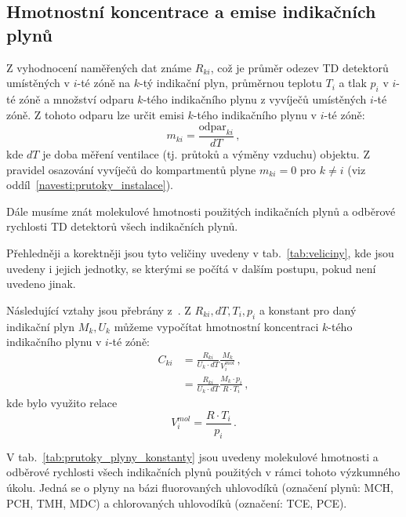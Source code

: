 \subsection{Hmotnostní koncentrace a emise indikačních plynů}
Z vyhodnocení naměřených dat známe $R_{ki}$, což je průměr odezev TD detektorů umístěných v $i$-té zóně na $k$-tý indikační plyn, průměrnou teplotu $T_i$ a tlak $p_i$ v $i$-té zóně a množství odparu $k$-tého indikačního plynu z vyvíječů umístěných $i$-té zóně. Z tohoto odparu lze určit emisi $k$-tého indikačního plynu v $i$-té zóně:
\begin{equation}
    m_{ki}=\frac{\text{odpar}_{ki}}{dT}\,,
    \label{eq:prutoky_emise}
\end{equation}
kde $dT$ je doba měření ventilace (tj. průtoků a výměny vzduchu) objektu. Z pravidel osazování vyvíječů do kompartmentů plyne $m_{ki}=0$ pro $k\neq i$ (viz oddíl~\ref{navesti:prutoky_instalace}). 

Dále musíme znát molekulové hmotnosti použitých indikačních plynů a odběrové rychlosti TD detektorů všech indikačních plynů.

Přehledněji a korektněji jsou tyto veličiny uvedeny v tab.~\ref{tab:veliciny}, kde jsou uvedeny i jejich jednotky, se kterými se počítá v dalším postupu, pokud není uvedeno jinak.

Následující vztahy jsou přebrány z~\cite{metodika}. Z $R_{ki}, dT, T_i, p_i$ a konstant pro daný indikační plyn $M_k, U_k$ můžeme vypočítat hmotnostní koncentraci $k$-tého indikačního plynu v $i$-té zóně:
\begin{align}
    C_{ki}&=\frac{R_{ki}}{U_k\cdot dT}\frac{M_k}{V_{i}^{mol}}\,,\\
    &=\frac{R_{ki}}{U_k\cdot dT}\frac{M_k\cdot p_i}{R\cdot T_i}\,,
\end{align}
kde bylo využito relace
\begin{equation}
    V^{mol}_{i}=\frac{R\cdot T_i}{p_i}\,.
    \label{eq:prutoky_molarniObjem}
\end{equation}

V tab.~\ref{tab:prutoky_plyny_konstanty} jsou uvedeny molekulové hmotnosti a odběrové rychlosti všech indikačních plynů použitých v rámci tohoto výzkumného úkolu. Jedná se o plyny na bázi fluorovaných uhlovodíků (označení plynů: MCH, PCH, TMH, MDC) a chlorovaných uhlovodíků (označení: TCE, PCE).

